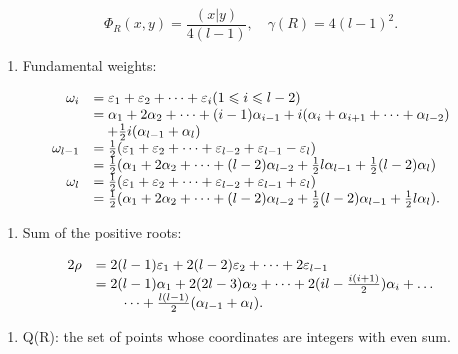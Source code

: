 \[
\Phi_ {R} (x, y) = \frac {(x | y)}{4 (l - 1)}, \quad \gamma (R) = 4 (l - 1) ^ {2}.
\]

\begin{enumerate}
\def\labelenumi{(\Roman{enumi})}
\setcounter{enumi}{5}
\tightlist
\item
  Fundamental weights:
\end{enumerate}

\[
\begin{array}{r l} \omega_ {i} & = \varepsilon_ {1} + \varepsilon_ {2} + \dots + \varepsilon_ {i} (1 \leqslant i \leqslant l - 2) \\ & = \alpha_ {1} + 2 \alpha_ {2} + \dots + (i - 1) \alpha_ {i - 1} + i (\alpha_ {i} + \alpha_ {i + 1} + \dots + \alpha_ {l - 2}) \\ & \quad + \frac {1}{2} i (\alpha_ {l - 1} + \alpha_ {l}) \\ \omega_ {l - 1} & = \frac {1}{2} (\varepsilon_ {1} + \varepsilon_ {2} + \dots + \varepsilon_ {l - 2} + \varepsilon_ {l - 1} - \varepsilon_ {l}) \\ & = \frac {1}{2} (\alpha_ {1} + 2 \alpha_ {2} + \dots + (l - 2) \alpha_ {l - 2} + \frac {1}{2} l \alpha_ {l - 1} + \frac {1}{2} (l - 2) \alpha_ {l}) \\ \omega_ {l} & = \frac {1}{2} (\varepsilon_ {1} + \varepsilon_ {2} + \dots + \varepsilon_ {l - 2} + \varepsilon_ {l - 1} + \varepsilon_ {l}) \\ & = \frac {1}{2} (\alpha_ {1} + 2 \alpha_ {2} + \dots + (l - 2) \alpha_ {l - 2} + \frac {1}{2} (l - 2) \alpha_ {l - 1} + \frac {1}{2} l \alpha_ {l}). \end{array}
\]

\begin{enumerate}
\def\labelenumi{(\Roman{enumi})}
\setcounter{enumi}{6}
\tightlist
\item
  Sum of the positive roots:
\end{enumerate}

\[
\begin{array}{r l} 2 \rho & = 2 (l - 1) \varepsilon_ {1} + 2 (l - 2) \varepsilon_ {2} + \dots + 2 \varepsilon_ {l - 1} \\ & = 2 (l - 1) \alpha_ {1} + 2 (2 l - 3) \alpha_ {2} + \dots + 2 (i l - \frac {i (i + 1)}{2}) \alpha_ {i} + \dots \\ & \qquad \dots + \frac {l (l - 1)}{2} (\alpha_ {l - 1} + \alpha_ {l}). \end{array}
\]

\begin{enumerate}
\def\labelenumi{(\Roman{enumi})}
\setcounter{enumi}{7}
\tightlist
\item
  Q(R): the set of points whose coordinates are integers with even sum.
\end{enumerate}

